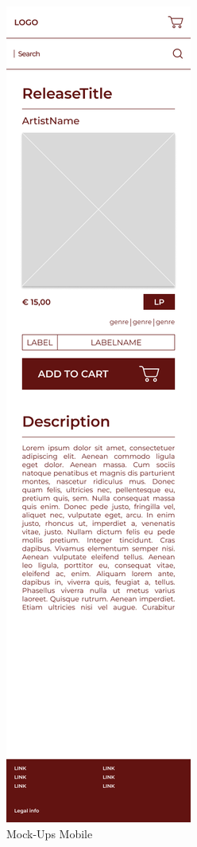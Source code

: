 \begin{figure}
	\includegraphics[width=0.3\linewidth]{graphics/DetailsPageMobile}
	\caption[Mock-Ups Mobile]{Mock-Ups Mobile}
	\label{fig:mobileMockUps}
\end{figure}

